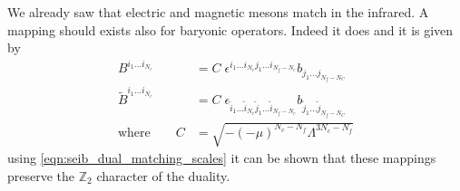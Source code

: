We already saw that electric and magnetic mesons match in the infrared. 
A mapping should exists also for baryonic operators. Indeed it does and it is given by
\begin{equation}
\begin{aligned}
 B^{i_1 \dots i_{N_c}} & = C \; \epsilon^{i_1 \dots i_{N_c} j_1 \dots i_{N_f - N_c}} b_{j_1 \dots j_{N_f - N_C}}\\
 \tilde{B}^{i_1 \dots i_{N_c}} &= C \; \epsilon_{\tilde{i}_1 \dots \tilde{i}_{N_c} \tilde{j}_1 \dots \tilde{i}_{N_f - N_c}} b_{ \tilde{j}_1 \dots \tilde{j}_{N_f - N_C}}\\
 \text{where} \qquad C & = \sqrt{ - (-\mu)^{N_c - N_f} \Lambda^{3 N_c - N_f}}
\end{aligned}
\end{equation}
using \eqref{eqn:seib_dual_matching_scales} it can be shown that these mappings preserve the $\mathbb{Z}_2$ character of the duality. 

